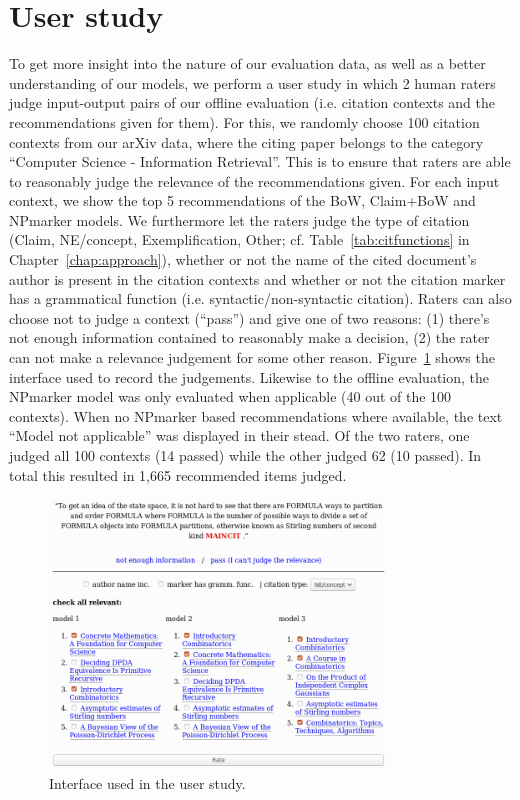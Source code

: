 \section{User study}\label{sec:oneval}
To get more insight into the nature of our evaluation data, as well as a better understanding of our models, we perform a user study in which 2 human raters judge input-output pairs of our offline evaluation (i.e. citation contexts and the recommendations given for them). For this, we randomly choose 100 citation contexts from our arXiv data, where the citing paper belongs to the category ``Computer Science - Information Retrieval''. This is to ensure that raters are able to reasonably judge the relevance of the recommendations given. For each input context, we show the top 5 recommendations of the BoW, Claim+BoW and NPmarker models. We furthermore let the raters judge the type of citation (Claim, NE/concept, Exemplification, Other; cf. Table~\ref{tab:citfunctions} in Chapter~\ref{chap:approach}), whether or not the name of the cited document's author is present in the citation contexts and whether or not the citation marker has a grammatical function (i.e. syntactic/non-syntactic citation). Raters can also choose not to judge a context (``pass'') and give one of %
two reasons: (1) there's not enough information contained to reasonably make a decision, %
(2) the rater can not make a relevance judgement for some other reason. Figure~\ref{fig:interface} shows the interface used to record the judgements. Likewise to the offline evaluation, the NPmarker model was only evaluated when applicable (40 out of the 100 contexts). When no NPmarker based recommendations where available, the text ``Model not applicable'' was displayed in their stead. Of the two raters, one judged all 100 contexts (14 passed) while the other judged 62 (10 passed). In total this resulted in 1,665 recommended items judged.


\begin{figure}[t]
  \centering
    \includegraphics[width=0.8\textwidth]{figures/evaluation/interface.png}
  \caption{Interface used in the user study.}
  \label{fig:interface}
\end{figure}

